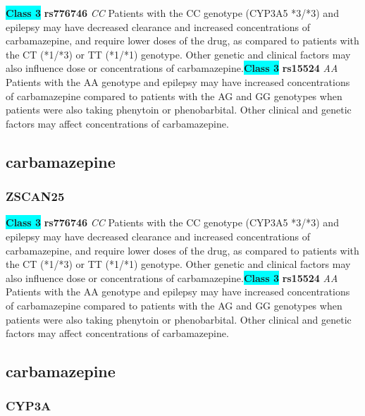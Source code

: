 \documentclass{book}
\begin{document}
\begin{center}
\textbf{\colorbox{cyan} {Class 3}} \textbf{ rs776746 } \textit{ CC }
Patients with the CC genotype (CYP3A5 *3/*3) and epilepsy may have decreased clearance and increased concentrations of carbamazepine, and require lower doses of the drug, as compared to patients with the CT (*1/*3) or TT (*1/*1) genotype. Other genetic and clinical factors may also influence dose or concentrations of carbamazepine.\textbf{\colorbox{cyan} {Class 3}} \textbf{ rs15524 } \textit{ AA }
Patients with the AA genotype and epilepsy may have increased concentrations of carbamazepine compared to patients with the AG and GG genotypes when patients were also taking phenytoin or phenobarbital. Other clinical and genetic factors may affect concentrations of carbamazepine. 


\end{center}\subsection{ carbamazepine }


\subsubsection{ ZSCAN25 }

\begin{center}
\textbf{\colorbox{cyan} {Class 3}} \textbf{ rs776746 } \textit{ CC }
Patients with the CC genotype (CYP3A5 *3/*3) and epilepsy may have decreased clearance and increased concentrations of carbamazepine, and require lower doses of the drug, as compared to patients with the CT (*1/*3) or TT (*1/*1) genotype. Other genetic and clinical factors may also influence dose or concentrations of carbamazepine.\textbf{\colorbox{cyan} {Class 3}} \textbf{ rs15524 } \textit{ AA }
Patients with the AA genotype and epilepsy may have increased concentrations of carbamazepine compared to patients with the AG and GG genotypes when patients were also taking phenytoin or phenobarbital. Other clinical and genetic factors may affect concentrations of carbamazepine. 


\end{center}\subsection{ carbamazepine }


\subsubsection{ CYP3A }
\end{document}
